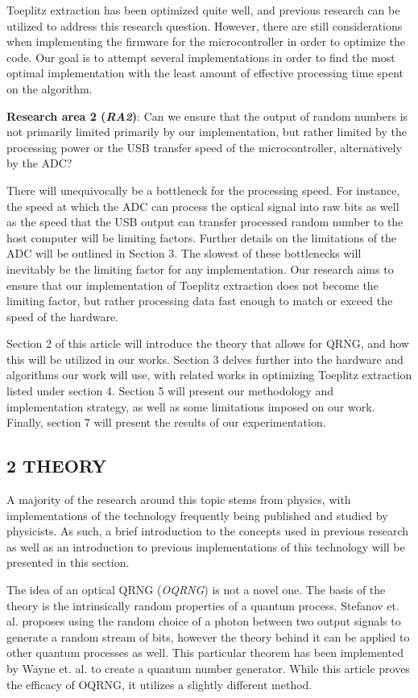 Toeplitz extraction has been optimized quite well, and previous research can be utilized to address this research question. However, there are still considerations when implementing the firmware for the microcontroller in order to optimize the code. Our goal is to attempt several implementations in order to find the most optimal implementation with the least amount of effective processing time spent on the algorithm.

\textbf{Research area 2 (\emph{RA2})}: Can we ensure that the output of random numbers is not primarily limited primarily by our implementation, but rather limited by the processing power or the USB transfer speed of the microcontroller, alternatively by the ADC?

There will unequivocally be a bottleneck for the processing speed. For instance, the speed at which the ADC can process the optical signal into raw bits as well as the speed that the USB output can transfer processed random number to the host computer will be limiting factors. Further details on the limitations of the ADC will be outlined in Section 3. The slowest of these bottlenecks will inevitably be the limiting factor for any implementation. Our research aims to ensure that our implementation of Toeplitz extraction does not become the limiting factor, but rather processing data fast enough to match or exceed the speed of the hardware.

Section 2 of this article will introduce the theory that allows for QRNG, and how this will be utilized in our works. Section 3 delves further into the hardware and algorithms our work will use, with related works in optimizing Toeplitz extraction listed under section 4. Section 5 will present our methodology and implementation strategy, as well as some limitations imposed on our work. Finally, section 7 will present the results of our experimentation.

\hypertarget{theory}{%
\subsection{2 THEORY}\label{theory}}

A majority of the research around this topic stems from physics, with implementations of the technology frequently being published and studied by physicists. As such, a brief introduction to the concepts used in previous research as well as an introduction to previous implementations of this technology will be presented in this section.

The idea of an optical QRNG (\emph{OQRNG}) is not a novel one. The basis of the theory is the intrinsically random properties of a quantum process. Stefanov et. al. \cite{StefanovOptical} proposes using the random choice of a photon between two output signals to generate a random stream of bits, however the theory behind it can be applied to other quantum processes as well. This particular theorem has been implemented by Wayne et. al. \cite{Wayne} to create a quantum number generator. While this article proves the efficacy of OQRNG, it utilizes a slightly different method.

